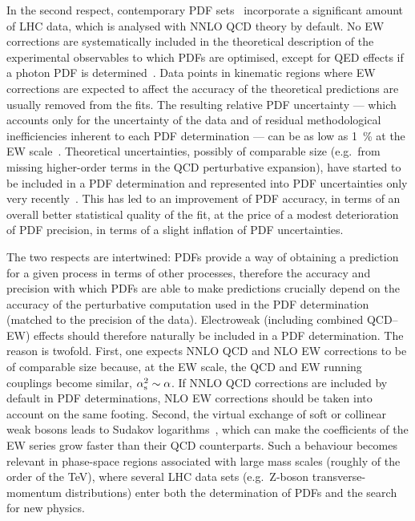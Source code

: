 In the second respect, contemporary PDF
sets~\cite{Harland-Lang:2014zoa,Ball:2017nwa,Hou:2019efy}
incorporate a significant amount of LHC data, which is analysed with NNLO QCD 
theory by default. No EW corrections are systematically included in the 
theoretical description of the experimental observables to which PDFs are 
optimised, except for QED effects if a photon PDF is 
determined~\cite{Schmidt:2015zda,Manohar:2016nzj,Manohar:2017eqh,Bertone:2017bme,Harland-Lang:2019pla}.
Data points in kinematic regions where EW corrections are expected to affect
the accuracy of the theoretical predictions are usually removed from the fits.
The resulting relative PDF uncertainty --- which accounts only for the
uncertainty of the data and of residual methodological inefficiencies inherent to 
each PDF determination --- can be as low as \SI{1}{\percent} at the EW
scale~\cite{Ball:2017nwa}. Theoretical uncertainties, possibly of comparable 
size (e.g.\ from missing higher-order terms in the QCD perturbative
expansion), have started to be included in a PDF determination and represented 
into PDF uncertainties only very 
recently~\cite{AbdulKhalek:2019bux,AbdulKhalek:2019ihb}. This has led to an 
improvement of PDF accuracy, in terms of an overall
better statistical quality of the fit, at the price of a modest deterioration 
of PDF precision, in terms of a slight inflation of PDF uncertainties.

The two respects are intertwined: PDFs provide a way of obtaining a prediction
for a given process in terms of other processes, therefore the accuracy and 
precision with which PDFs are able to make predictions crucially depend on 
the accuracy of the perturbative computation used in the PDF determination
(matched to the precision of the data). Electroweak (including combined QCD--EW) 
effects should therefore naturally be included in a PDF determination. The 
reason is twofold. First, one expects NNLO QCD and NLO EW corrections to be of 
comparable size because, at the EW scale, the QCD and EW running couplings 
become similar, $\alpha_\mathrm{s}^2\sim \alpha$. If NNLO QCD corrections are included
by default in PDF determinations, NLO EW corrections should be
taken into account on the same footing. Second, the virtual exchange of soft or 
collinear weak bosons leads to Sudakov 
logarithms~\cite{Denner:2000jv,Denner:2001gw},
which can make the coefficients of the EW series grow faster than 
their QCD counterparts. Such a behaviour becomes relevant in
phase-space regions associated with large mass scales (roughly of the order
of the \si{\tera\electronvolt}), where several LHC data sets (e.g.\ Z-boson
transverse-momentum distributions) enter both the determination of PDFs and the search
for new physics.

